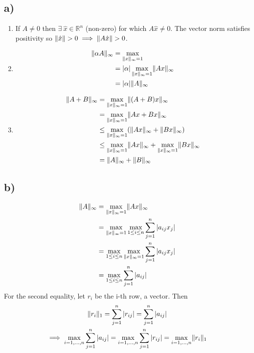 \documentclass[12pt]{article}
\DeclarePairedDelimiter{\norm}{\lVert}{\rVert}
\theoremstyle{definition}
\theoremstyle{definition}
\theoremstyle{definition}
\theoremstyle{definition}
\theoremstyle{definition}
\theoremstyle{example}
\theoremstyle{note}
\theoremstyle{remark}
\theoremstyle{example}
\begin{document}
				\subsection*{a) }
					\begin{enumerate}[label=(\roman*)]
						\item If $A \neq 0$ then $\exists \ \hat{x} \in \mathbb{R}^{n} $ (non-zero) for which $A \hat{x}\neq 0$. The vector norm satisfies positivity so $\norm{\hat{x}}>0 \implies \norm{A\hat{x}} >0$. 
						\item \begin{align*}
							\norm{\alpha A}_{\infty} &= \max\limits_{\norm{x}_{\infty} =1} \\&= \abs{\alpha} \max\limits_{\norm{x}_{\infty} =1} \norm{Ax}_{\infty} \\
							&= \abs{\alpha} \norm{A}_{\infty} 
						\end{align*} 
						\item \begin{align*}
							\norm{A + B}_{\infty} &= \max\limits_{\norm{x}_{\infty} =1 }\norm{(A+B)x}_{\infty} \\
							&= \max\limits_{\norm{x}_{\infty} =1 } \norm{Ax + Bx}_{\infty} \\
							&\le \max\limits_{\norm{x}_{\infty} =1 }( \norm{Ax}_{\infty} + \norm{Bx}_{\infty}) \\
							&\le \max\limits_{\norm{x}_{\infty} =1 }\norm{Ax}_{\infty} + \max\limits_{\norm{x}_{\infty} =1 }\norm{Bx}_{\infty} \\
							&= \norm{A}_{\infty} + \norm{B}_{\infty}
						\end{align*}
					\end{enumerate}
				\subsection*{b) }
					\begin{align*}
						\norm{A}_{\infty} &= \max\limits_{\norm{x}_{\infty} =1 }\norm{Ax}_{\infty} \\
						&= \max\limits_{\norm{x}_{\infty} =1 } \max\limits_{1 \le i \le n} \sum_{j=1}^{n} \abs{a_{ij}x_{j}} \\
						&= \max\limits_{1 \le i \le n} \max\limits_{\norm{x}_{\infty} =1 } \sum_{j=1}^{n} \abs{a_{ij}x_{j}} \\
						&=\max\limits_{1 \le i \le n} \sum_{j=1}^{n} \abs{a_{ij}}
					\end{align*}
					For the second equality, let $r_{i}$ be the i-th row, a vector. Then 
					\begin{gather*}
						\norm{r_{i}}_{1} = \sum_{j=1}^{n} \abs{r_{ij}} = \sum_{j=1}^{n} \abs{a_{ij}} \\
						\implies \max\limits_{i= 1,\dots,n} \sum_{j=1}^{n} \abs{a_{ij}} = \max_{i = 1, \dots,n} \sum_{j=1}^{n} \abs{r_{ij}} = \max\limits_{i=1,\dots,n} \norm{r_{i}}_{1}
					\end{gather*}
\end{document}
